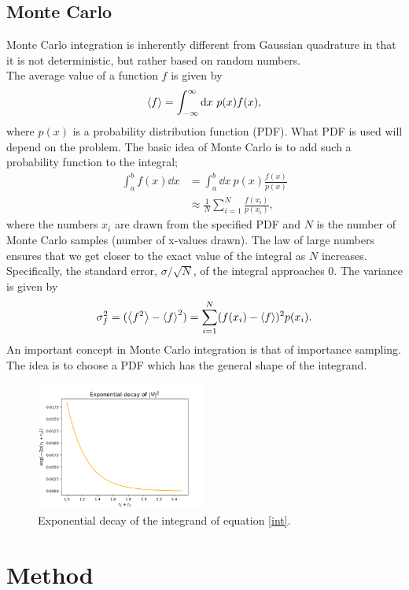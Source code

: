 \documentclass[notitlepage, reprint, nofootinbib]{revtex4-1}
\begin{document}
\subsection{Monte Carlo}
Monte Carlo integration is inherently different from Gaussian quadrature in that it is not deterministic, but rather based on random numbers.\\[2mm]
The average value of a function $f$ is given by
$$\expval {f}=\int_{-\infty}^\infty \dd x\ p(x) f(x),$$
where $p(x)$ is a probability distribution function (PDF). What PDF is used will depend on the problem. The basic idea of Monte Carlo is to add such a probability function to the integral;
\begin{align}
	\int_a^b f(x) \dd x&=\int_a^b \dd x\ p(x) \frac{f(x)}{p(x)}\nonumber \\
	&\approx \frac{1}{N}\sum_{i=1}^{N} \frac{f(x_i)}{p(x_i)}, \label{MC_formula}
\end{align}
where the numbers $x_i$ are drawn from the specified PDF and $N$ is the number of Monte Carlo samples (number of x-values drawn). The law of large numbers ensures that we get closer to the exact value of the integral as $N$ increases. Specifically, the standard error, $\sigma/\sqrt{N}$, of the integral approaches 0. The variance is given by
\begin{equation}\label{var}\sigma^2_f = (\expval{f^2} - \expval{f}^2)=\sum_{i=1}^N (f(x_i)-\expval{f})^2p(x_i).\end{equation}
An important concept in Monte Carlo integration is that of importance sampling. The idea is to choose a PDF which has the general shape of the integrand. 
\begin{figure}[h!]
	\centering
	\includegraphics[width=0.5\textwidth]{../Figures/wavefunc.png}
	\caption{Exponential decay of the integrand of equation \ref{int}.}
	\label{wavefunc}
\end{figure}
\section{Method}
\end{document}
